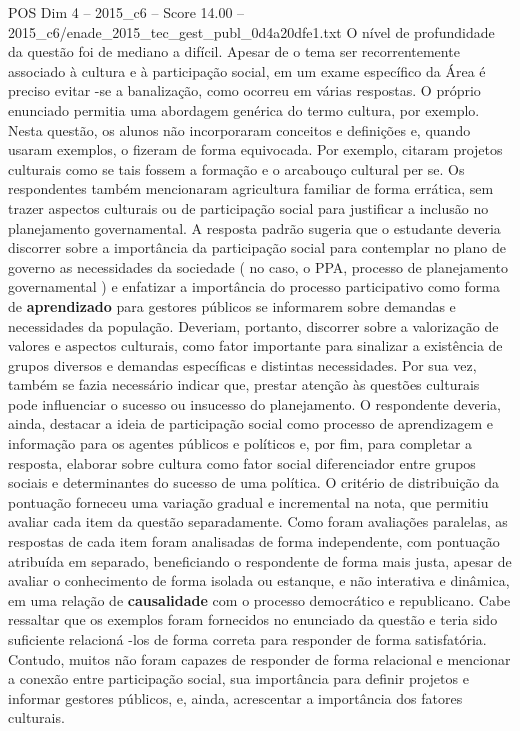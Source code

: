 \begin{textsample}{POS Dim 4 – 2015\_c6 – Score 14.00 – 2015\_c6/enade\_2015\_tec\_gest\_publ\_0d4a20dfe1.txt}
O nível de profundidade da questão foi de mediano a difícil.
Apesar de o tema ser recorrentemente associado à cultura e à participação social, em um exame específico da Área é preciso evitar -se a banalização, como ocorreu em várias respostas.
O próprio enunciado permitia uma abordagem genérica do termo cultura, por exemplo.
Nesta questão, os alunos não incorporaram conceitos e definições e, quando usaram exemplos, o fizeram de forma equivocada.
Por exemplo, citaram projetos culturais como se tais fossem a formação e o arcabouço cultural per se.
Os respondentes também mencionaram agricultura familiar de forma errática, sem trazer aspectos culturais ou de participação social para justificar a inclusão no planejamento governamental.
A resposta padrão sugeria que o estudante deveria discorrer sobre a importância da participação social para contemplar no plano de governo as necessidades da sociedade ( no caso, o PPA, processo de planejamento governamental ) e enfatizar a importância do processo participativo como forma de \textbf{aprendizado} para gestores públicos se informarem sobre demandas e necessidades da população.
Deveriam, portanto, discorrer sobre a valorização de valores e aspectos culturais, como fator importante para sinalizar a existência de grupos diversos e demandas específicas e distintas necessidades.
Por sua vez, também se fazia necessário indicar que, prestar atenção às questões culturais pode influenciar o sucesso ou insucesso do planejamento.
O respondente deveria, ainda, destacar a ideia de participação social como processo de aprendizagem e informação para os agentes públicos e políticos e, por fim, para completar a resposta, elaborar sobre cultura como fator social diferenciador entre grupos sociais e determinantes do sucesso de uma política.
O critério de distribuição da pontuação forneceu uma variação gradual e incremental na nota, que permitiu avaliar cada item da questão separadamente.
Como foram avaliações paralelas, as respostas de cada item foram analisadas de forma independente, com pontuação atribuída em separado, beneficiando o respondente de forma mais justa, apesar de avaliar o conhecimento de forma isolada ou estanque, e não interativa e dinâmica, em uma relação de \textbf{causalidade} com o processo democrático e republicano.
Cabe ressaltar que os exemplos foram fornecidos no enunciado da questão e teria sido suficiente relacioná -los de forma correta para responder de forma satisfatória.
Contudo, muitos não foram capazes de responder de forma relacional e mencionar a conexão entre participação social, sua importância para definir projetos e informar gestores públicos, e, ainda, acrescentar a importância dos fatores culturais.

\end{textsample}
